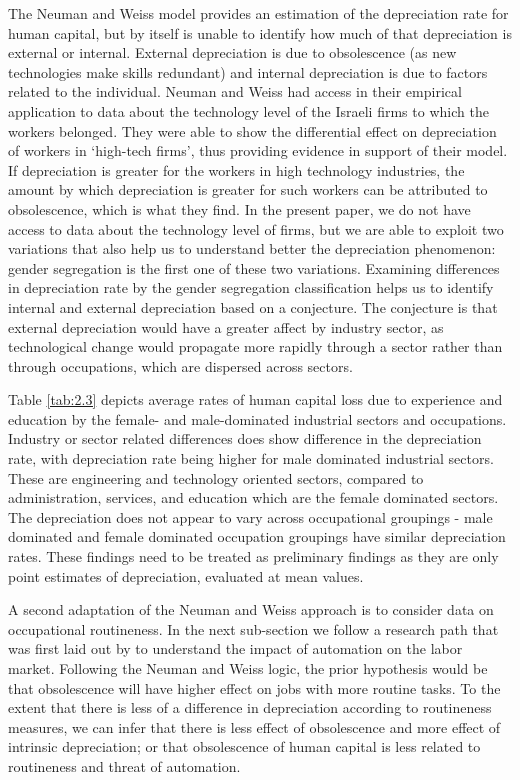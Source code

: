 \documentclass[alpha-refs]{wiley-article-02b}
\begin{document}
The Neuman and Weiss model provides an estimation of the depreciation rate 
for human capital, but by itself is unable to identify how much of that  
depreciation is external or internal. External depreciation is due to 
obsolescence (as new technologies make skills redundant) and internal 
depreciation is due to factors related to the individual. Neuman and Weiss 
had access in their empirical application to data about the technology 
level of the Israeli firms to which the workers belonged. They were able to 
show the differential effect on depreciation of workers in `high-tech 
firms', thus providing evidence in support of their model. If depreciation 
is greater for the workers in high technology industries, the amount by 
which depreciation is greater for such workers can be attributed to 
obsolescence, which is what they find. In the present paper, we do not have 
access to data about the technology level of firms, but we are able to 
exploit two variations that also help us to understand better the 
depreciation phenomenon: gender segregation is the first one of these two 
variations. Examining differences in depreciation rate by the gender 
segregation classification helps us to identify internal and external 
depreciation based on a conjecture. The conjecture is that external 
depreciation would have a greater affect by  industry sector, as 
technological change would propagate more rapidly through a sector rather 
than through occupations, which are dispersed across sectors. 

Table \ref{tab:2.3} depicts average rates of human capital loss due to 
experience and education by the female- and male-dominated industrial 
sectors and occupations. Industry or sector related differences does show 
difference in the depreciation rate, with depreciation rate being higher 
for male dominated industrial sectors. These are engineering and technology 
oriented sectors, compared to administration, services, and education which 
are the female dominated sectors. The depreciation does not appear to vary 
across occupational groupings - male dominated and female dominated 
occupation groupings have similar depreciation rates. These findings need 
to be treated as preliminary findings as they are only point estimates of 
depreciation, evaluated at mean values. 

A second adaptation of the Neuman and Weiss approach is to consider data on 
occupational routineness. In the next sub-section we follow a research path 
that was first laid out by \cite{acemoglu2011} to understand the impact of 
automation on the labor market. Following the Neuman and Weiss logic, the 
prior hypothesis would be that obsolescence will have higher effect on jobs 
with more routine tasks. To the extent that there is less of a difference 
in depreciation according to routineness measures, we can infer that there 
is less effect of obsolescence and more effect of intrinsic depreciation;  
or that obsolescence of human capital is less related to routineness and 
threat of automation. 
\end{document}
